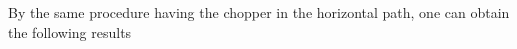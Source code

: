 \documentclass[12pt]{book}
\begin{document}
By the same procedure having the chopper in the horizontal path, one can obtain the following results 
\end{document}
